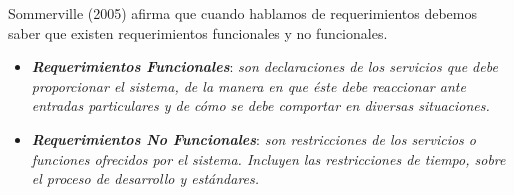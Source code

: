 \documentclass[11pt,oneside]{book}
\begin{document}
Sommerville (2005) afirma que cuando hablamos de requerimientos debemos saber que existen requerimientos funcionales y no funcionales.
\begin{itemize}
\item \textbf{\textit{Requerimientos Funcionales}}: \textit{son declaraciones de los servicios que debe proporcionar el sistema, de la manera en que éste debe reaccionar ante entradas particulares y de cómo se debe comportar en diversas situaciones.} 


\item \textbf{\textit{Requerimientos No Funcionales}}: \textit{son restricciones de los servicios o funciones ofrecidos por el sistema. Incluyen las restricciones de tiempo, sobre el proceso de desarrollo y estándares.}

\end{itemize}
\end{document}
